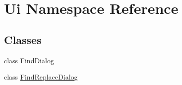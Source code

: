 \hypertarget{namespace_ui}{}\section{Ui Namespace Reference}
\label{namespace_ui}
\subsection*{Classes}
\begin{DoxyCompactItemize}
\item 
class \hyperlink{class_ui_1_1_find_dialog}{Find\+Dialog}
\item 
class \hyperlink{class_ui_1_1_find_replace_dialog}{Find\+Replace\+Dialog}
\end{DoxyCompactItemize}
